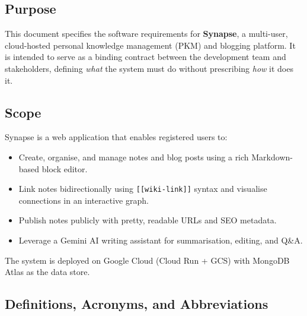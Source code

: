 \documentclass[12pt, a4paper]{article}
\begin{document}
\subsection{Purpose}

This document specifies the software requirements for \textbf{Synapse}, a
multi-user, cloud-hosted personal knowledge management (PKM) and blogging
platform. It is intended to serve as a binding contract between the development
team and stakeholders, defining \emph{what} the system must do without
prescribing \emph{how} it does it.

\subsection{Scope}

Synapse is a web application that enables registered users to:

\begin{itemize}[leftmargin=2em]
  \item Create, organise, and manage notes and blog posts using a rich
        Markdown-based block editor.
  \item Link notes bidirectionally using \texttt{[[wiki-link]]} syntax and
        visualise connections in an interactive graph.
  \item Publish notes publicly with pretty, readable URLs and SEO metadata.
  \item Leverage a Gemini AI writing assistant for summarisation, editing,
        and Q\&A.
\end{itemize}

The system is deployed on Google Cloud (Cloud Run + GCS) with MongoDB Atlas as
the data store.

\subsection{Definitions, Acronyms, and Abbreviations}
\end{document}
